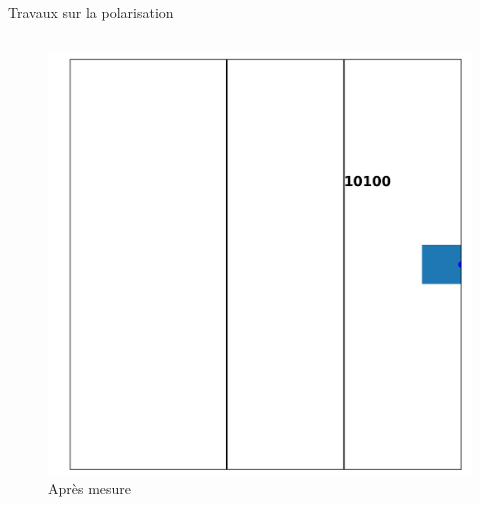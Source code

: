 \documentclass[french]{beamer}
\begin{document}
\begin{frame}{Travaux sur la polarisation}
\begin{columns}
\begin{column}{0.5\textwidth}
            \begin{figure}
                \captionsetup{labelformat=empty}
                \includegraphics[scale=0.1]{ApresMesure.png}
                \caption{\small Après mesure}
            \end{figure}
        \end{column}
    \end{columns}
\end{frame}
\end{document}
